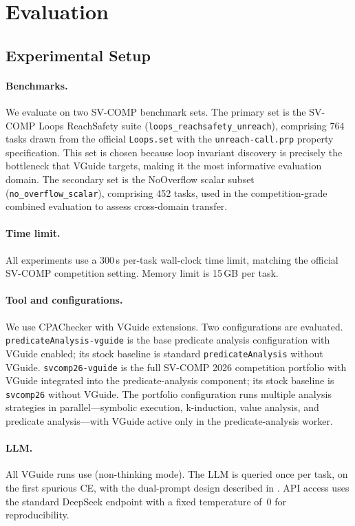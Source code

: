 \section{Evaluation}
\label{sec:evaluation}

\subsection{Experimental Setup}

\paragraph{Benchmarks.} We evaluate on two SV-COMP benchmark sets. The primary set is
the SV-COMP Loops ReachSafety suite (\texttt{loops\_reachsafety\_unreach}), comprising
764 tasks drawn from the official \texttt{Loops.set} with the
\texttt{unreach-call.prp} property specification. This set is chosen because loop
invariant discovery is precisely the bottleneck that VGuide targets, making it the most
informative evaluation domain. The secondary set is the NoOverflow scalar subset
(\texttt{no\_overflow\_scalar}), comprising 452 tasks, used in the competition-grade
combined evaluation to assess cross-domain transfer.

\paragraph{Time limit.} All experiments use a 300\,s per-task wall-clock time limit,
matching the official SV-COMP competition setting. Memory limit is 15\,GB per task.

\paragraph{Tool and configurations.} We use CPAChecker with VGuide extensions. Two
configurations are evaluated. \texttt{predicateAnalysis-vguide} is the base predicate
analysis configuration with VGuide enabled; its stock baseline is standard
\texttt{predicateAnalysis} without VGuide. \texttt{svcomp26-vguide} is the full
SV-COMP 2026 competition portfolio with VGuide integrated into the predicate-analysis
component; its stock baseline is \texttt{svcomp26} without VGuide. The portfolio
configuration runs multiple analysis strategies in parallel---symbolic execution,
k-induction, value analysis, and predicate analysis---with VGuide active only in the
predicate-analysis worker.

\paragraph{LLM.} All VGuide runs use \LLMName{} (non-thinking mode). The LLM is queried
once per task, on the first spurious CE, with the dual-prompt design described in
. API access uses the standard DeepSeek endpoint with a fixed
temperature of~0 for reproducibility.

